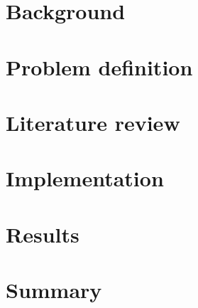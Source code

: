\documentclass[english,12pt,a4paper,pdftex,sci,utf8]{aaltothesis}
\begin{document}
\thispagestyle{empty}


\clearpage

\section{Background}
\label{sec:background}




\clearpage

\section{Problem definition}
\label{sec:problem-definition}

\clearpage

\section{Literature review}
\label{sec:review}



\clearpage

\section{Implementation}
\label{sec:implementation}

\clearpage

\section{Results}
\label{sec:results}

\clearpage

\section{Summary} 
\label{sec:summary}

\clearpage





\end{document}
